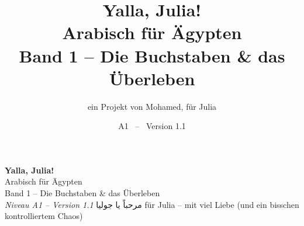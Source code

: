 \documentclass[12pt,a4paper,openany]{book}
\title{\Huge\bfseries\color{yallanight}Yalla, Julia!\\[6pt]\Large\color{yallared}Arabisch für Ägypten\\[4pt]\large\color{yallanight}Band 1 -- Die Buchstaben \& das Überleben}
\author{ein Projekt von Mohamed, für Julia \faHeart}
\date{A1 \ -- \ Version 1.1}
\begin{document}
\frontmatter
\begin{titlepage}
\centering
\vspace*{1cm}
\yallarule
\vspace{1.5cm}
{\Huge\bfseries\color{yallanight} Yalla, Julia! \faSmileWink}\\[10pt]
{\Large\color{yallared} Arabisch für Ägypten}\\[6pt]
{\large\color{yallanight} Band 1 -- Die Buchstaben \& das Überleben}\\[4pt]
{\normalsize\itshape Niveau A1 -- Version 1.1}
\vspace{2cm}
\textarabic{\bigletterfont\fontsize{40}{40}\selectfont مرحباً يا جوليا}
\vspace{1.5cm}
{\normalsize für Julia -- mit viel Liebe (und ein bisschen kontrolliertem Chaos)}
\vfill
\yallarule
\end{titlepage}
\tableofcontents

\mainmatter








\end{document}
